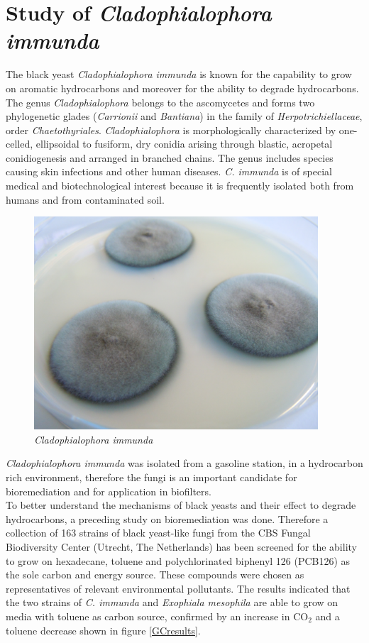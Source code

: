 \documentclass[12pt, a4paper]{report}
\begin{document}
\section{Study of \textit{Cladophialophora immunda}}
The black yeast \textit{Cladophialophora immunda} is known for the capability to grow on aromatic hydrocarbons and moreover for the ability to degrade hydrocarbons.\\
The genus \textit{Cladophialophora} belongs to the ascomycetes and forms two phylogenetic glades (\textit{Carrionii} and \textit{Bantiana}) in the family of \textit{Herpotrichiellaceae}, order \textit{Chaetothyriales}. \textit{Cladophialophora} is morphologically characterized by one-celled, ellipsoidal to fusiform, dry conidia arising through blastic, acropetal conidiogenesis and arranged in branched chains. The genus includes species causing skin infections and other human diseases. \textit{C. immunda} is of special medical and biotechnological interest because it is frequently isolated both from humans and from contaminated soil. \cite{Sterflinger2015, Badali2008}

 \begin{figure}[H]
 	\centering	
 	\includegraphics[width=300pt]{pics/cimmunda1.JPG}
 	\caption[\textit{Cladophialophora immunda}]
 	{\textit{Cladophialophora immunda}}
\end{figure}
  
\textit{Cladophialophora immunda} was isolated from a gasoline station, in a hydrocarbon rich environment, therefore the fungi is an important candidate for bioremediation and for application in biofilters. \cite{Prenafeta-Boldu2001} \\
To better understand the mechanisms of black yeasts and their effect to degrade hydrocarbons, a preceding study on bioremediation was done. Therefore a collection of 163 strains of black yeast-like fungi from the CBS Fungal Biodiversity Center (Utrecht, The Netherlands) has been screened for the ability to grow on hexadecane, toluene and polychlorinated biphenyl 126 (PCB126) as the sole carbon and energy source. These compounds were chosen as representatives of relevant environmental pollutants. 
The results indicated that the two strains of \textit{C. immunda} and \textit{Exophiala mesophila} are able to grow on media with toluene as carbon source, confirmed by an increase in CO$_2$ and a toluene decrease shown in figure \ref{GCresults}. \cite{BarbaraBlasi2015, Poyntner2014}
\end{document}

